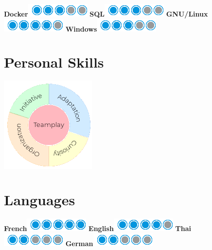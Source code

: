 \documentclass[]{friggeri-cv}
\begin{document}
\begin{aside}
    \textbf{Docker}\includegraphics[scale=0.40]{img/3puces.png}
    \textbf{SQL}\includegraphics[scale=0.40]{img/3puces.png}
    \textbf{GNU/Linux}\includegraphics[scale=0.40]{img/4puces.png}
    \textbf{Windows}\includegraphics[scale=0.40]{img/3puces.png}
    ~
  \section{Personal Skills}
  \hspace{1cm}
    \includegraphics[scale=0.62]{img/personal.png}
    ~
  \section{Languages}
  \hspace{1cm}
    \textbf{French}\includegraphics[scale=0.40]{img/5puces.png}
    \textbf{English}\includegraphics[scale=0.40]{img/4puces.png}
    \textbf{Thai}\includegraphics[scale=0.40]{img/2puces.png}
    \textbf{German}\includegraphics[scale=0.40]{img/2puces.png}
\end{aside}
\end{document}
